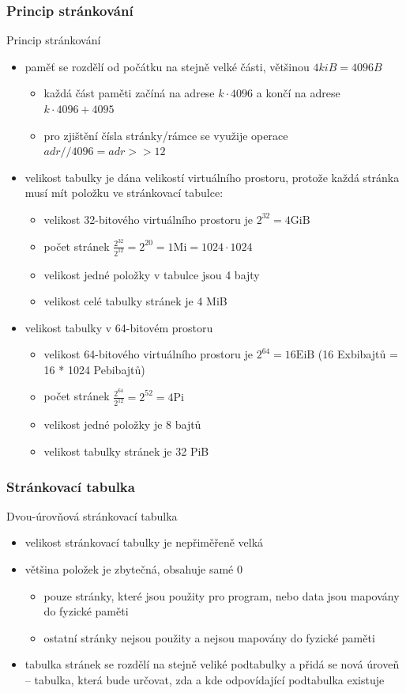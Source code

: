 \documentclass[aspectratio=169]{beamer}
\begin{document}
\begin{frame}
\frametitle{Princip stránkování}

Princip stránkování
\begin{itemize}
\item paměť se rozdělí od počátku na stejně velké části, většinou $4kiB = 4096B$
\begin{itemize}
\item každá část paměti začíná na adrese $k \cdot 4096$ a končí na adrese $k \cdot 4096 + 4095$
\item pro zjištění čísla stránky/rámce se využije operace $adr // 4096 = adr >> 12$
\end{itemize}
\item velikost tabulky je dána velikostí virtuálního prostoru, protože každá stránka musí mít položku ve stránkovací tabulce:
\begin{itemize}
\item velikost 32-bitového virtuálního prostoru je $2^{32} = 4\text{GiB}$
\item počet stránek $\frac{2^{32}}{2^{12}} = 2^{20} = 1\text{Mi} = 1024 \cdot 1024$
\item velikost jedné položky v tabulce jsou 4 bajty
\item velikost celé tabulky stránek je 4 MiB
\end{itemize}
\item velikost tabulky v 64-bitovém prostoru
\begin{itemize}
\item velikost 64-bitového virtuálního prostoru je $2^{64} = 16\text{EiB}$ (16 Exbibajtů = 16 * 1024 Pebibajtů)
\item počet stránek $\frac{2^{64}}{2^{12}} = 2^{52} = 4\text{Pi}$
\item velikost jedné položky je 8 bajtů
\item velikost tabulky stránek je 32 PiB
\end{itemize}
\end{itemize}
\end{frame}



\begin{frame}
\frametitle{Stránkovací tabulka}

Dvou-úrovňová stránkovací tabulka
\begin{itemize}
\item velikost stránkovací tabulky je nepřiměřeně velká
\item většina položek je zbytečná, obsahuje samé 0
\begin{itemize}
\item pouze stránky, které jsou použity pro program, nebo data jsou mapovány do fyzické paměti
\item ostatní stránky nejsou použity a nejsou mapovány do fyzické paměti
\end{itemize}
\item tabulka stránek se rozdělí na stejně veliké podtabulky a přidá se nová úroveň -- tabulka, která bude určovat, zda a kde odpovídající podtabulka existuje
\end{itemize}
\end{frame}
\end{document}
